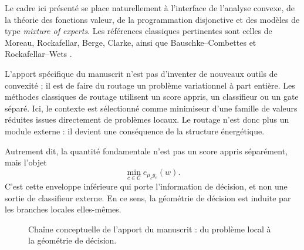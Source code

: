 \documentclass[11pt,a4paper]{article}
\newcommand{\Ccal}{\mathcal C}
\begin{document}
Le cadre ici présenté se place naturellement à l'interface de l'analyse convexe, de la théorie des fonctions valeur, de la programmation disjonctive et des modèles de type \emph{mixture of experts}. Les références classiques pertinentes sont celles de Moreau, Rockafellar, Berge, Clarke, ainsi que Bauschke--Combettes et Rockafellar--Wets \cite{Moreau1965,Rockafellar1970,Berge1963,Clarke1983,BauschkeCombettes2017,RockafellarWets1998}.

L'apport spécifique du manuscrit n'est pas d'inventer de nouveaux outils de convexité ; il est de faire du routage un problème variationnel à part entière. Les méthodes classiques de routage utilisent un score appris, un classifieur ou un gate séparé. Ici, le contexte est sélectionné comme minimiseur d'une famille de valeurs réduites issues directement de problèmes locaux. Le routage n'est donc plus un module externe : il devient une conséquence de la structure énergétique.

Autrement dit, la quantité fondamentale n'est pas un score appris séparément, mais l'objet
\[
\min_{c\in\Ccal} e_{\mu_c g_c}(w).
\]
C'est cette enveloppe inférieure qui porte l'information de décision, et non une sortie de classifieur externe. En ce sens, la géométrie de décision est induite par les branches locales elles-mêmes.

\begin{figure}[ht]
\centering
{}
\caption{Chaîne conceptuelle de l'apport du manuscrit : du problème local à la géométrie de décision.}
\end{figure}
\end{document}
